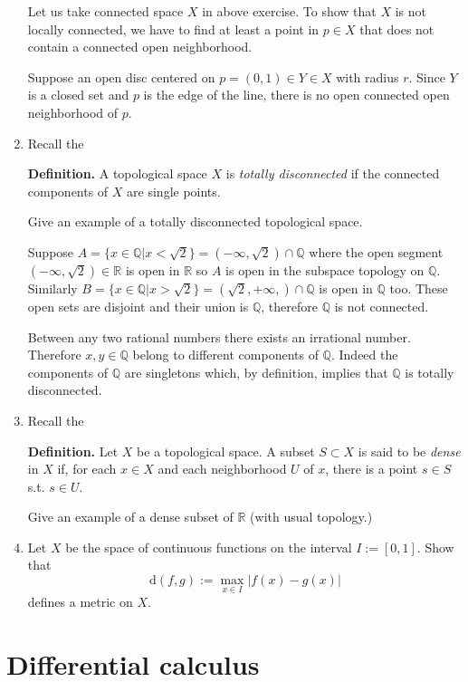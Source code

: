 \documentclass{article}
\begin{document}
\begin{enumerate}
\begin{ans_box}
  Let us take connected space $X$ in above exercise. To show that $X$ is not locally connected, we have to find at least a point in $p\in X$ that does not contain a connected open neighborhood.

  Suppose an open disc centered on $p=(0,1)\in Y\in X$ with radius $r$. Since $Y$ is a closed set and $p$ is the edge of the line, there is no open connected open neighborhood of $p$.
\end{ans_box}

\item Recall the

  \textbf{Definition.} A topological space $X$ is \textit{totally disconnected} if the connected components of $X$ are single points.

  Give an example of a totally disconnected topological space.

  \begin{ans_box}
    Suppose $A=\{x\in\mathbb{Q}|x<\sqrt{2}\}=(-\infty,\sqrt{2})\cap\mathbb{Q}$ where the open segment $(-\infty,\sqrt{2})\in\mathbb{R}$ is open in $\mathbb{R}$ so $A$ is open in the subspace topology on $\mathbb{Q}$. Similarly $B=\{x\in\mathbb{Q}|x>\sqrt{2}\}=(\sqrt{2},+\infty,)\cap\mathbb{Q}$ is open in $\mathbb{Q}$ too. These open sets are disjoint and their union is $\mathbb{Q}$, therefore $\mathbb{Q}$ is not connected.\medskip

  Between any two rational numbers there exists an irrational number. Therefore $x,y\in\mathbb{Q}$ belong to different components of $\mathbb{Q}$. Indeed the components of $\mathbb{Q}$ are  singletons which, by definition, implies that $\mathbb{Q}$ is totally disconnected.
  \end{ans_box}
  \item Recall the

  \textbf{Definition.} Let $X$ be a topological space. A subset $S\subset X$ is said to be \textit{dense} in $X$ if, for each $x\in X$ and each neighborhood $U$ of $x$, there is a point $s\in S$ s.t. $s\in U$.

  Give an example of a dense subset of $\mathbb{R}$ (with usual topology.)

  \item Let $X$ be the space of continuous functions on the interval $I:=[0,1]$. Show that $$\text{d}(f,g):=\max_{x\in I}|f(x)-g(x)|$$ defines a metric on $X$.
\end{enumerate}

\section{Differential calculus}
\end{document}
